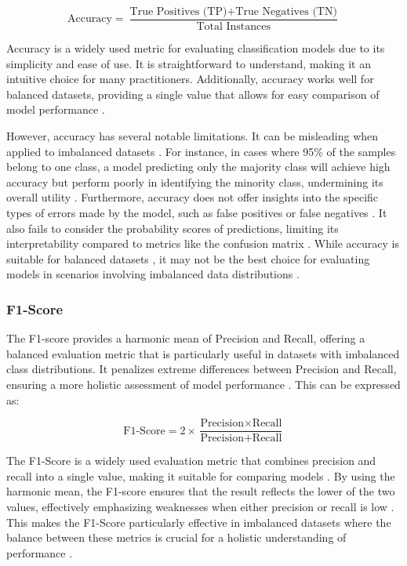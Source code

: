 \begin{equation}
    \text{Accuracy} = \frac{\text{True Positives (TP)} + \text{True Negatives (TN)}}{\text{Total Instances}}
\end{equation}


Accuracy is a widely used metric for evaluating classification models due to its simplicity and ease of use. It is straightforward to understand, making it an intuitive choice for many practitioners. Additionally, accuracy works well for balanced datasets, providing a single value that allows for easy comparison of model performance \cite{bose_classification_metrics}.

However, accuracy has several notable limitations. It can be misleading when applied to imbalanced datasets \cite{appliedai_evaluation_metrics}. For instance, in cases where 95\% of the samples belong to one class, a model predicting only the majority class will achieve high accuracy but perform poorly in identifying the minority class, undermining its overall utility \cite{appliedai_evaluation_metrics}. Furthermore, accuracy does not offer insights into the specific types of errors made by the model, such as false positives or false negatives \cite{bose_classification_metrics}. It also fails to consider the probability scores of predictions, limiting its interpretability compared to metrics like the confusion matrix \cite{bose_classification_metrics}. While accuracy is suitable for balanced datasets \cite{cohere_classification_metrics,duong_ml_evaluation_metrics}, it may not be the best choice for evaluating models in scenarios involving imbalanced data distributions \cite{duong_ml_evaluation_metrics}.

\subsubsection{F1-Score}
The F1-score provides a harmonic mean of Precision and Recall, offering a balanced evaluation metric that is particularly useful in datasets with imbalanced class distributions. It penalizes extreme differences between Precision and Recall, ensuring a more holistic assessment of model performance \cite{article}. This can be expressed as: 

\begin{equation}
    \text{F1-Score} = 2 \times \frac{\text{Precision} \times \text{Recall}}{\text{Precision} + \text{Recall}}
\end{equation}


The F1-Score is a widely used evaluation metric that combines precision and recall into a single value, making it suitable for comparing models \cite{serokell_f1_score_guide}. By using the harmonic mean, the F1-score ensures that the result reflects the lower of the two values, effectively emphasizing weaknesses when either precision or recall is low \cite{bose_classification_metrics}. This makes the F1-Score particularly effective in imbalanced datasets where the balance between these metrics is crucial for a holistic understanding of performance \cite{appliedai_evaluation_metrics}.

